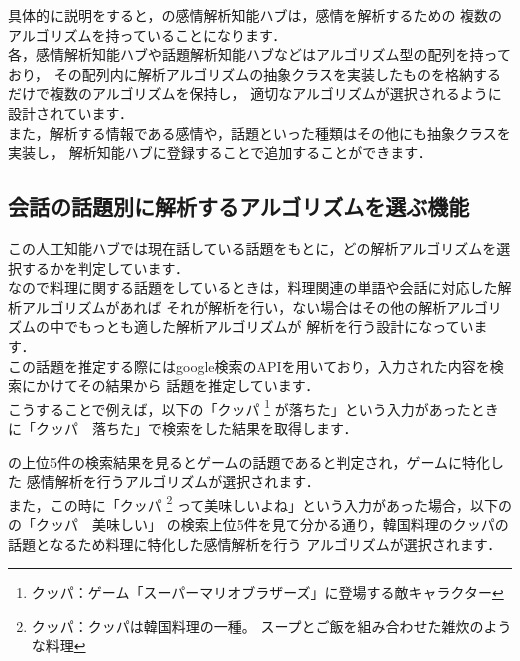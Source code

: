 
具体的に説明をすると，の感情解析知能ハブは，感情を解析するための
複数のアルゴリズムを持っていることになります．\\

各，感情解析知能ハブや話題解析知能ハブなどはアルゴリズム型の配列を持っており，
その配列内に解析アルゴリズムの抽象クラスを実装したものを格納するだけで複数のアルゴリズムを保持し，
適切なアルゴリズムが選択されるように設計されています．\\

また，解析する情報である感情や，話題といった種類はその他にも抽象クラスを実装し，
解析知能ハブに登録することで追加することができます．\\


\subsection{会話の話題別に解析するアルゴリズムを選ぶ機能}
この人工知能ハブでは現在話している話題をもとに，どの解析アルゴリズムを選択するかを判定しています．\\
なので料理に関する話題をしているときは，料理関連の単語や会話に対応した解析アルゴリズムがあれば
それが解析を行い，ない場合はその他の解析アルゴリズムの中でもっとも適した解析アルゴリズムが
解析を行う設計になっています．\\
この話題を推定する際にはgoogle検索のAPIを用いており，入力された内容を検索にかけてその結果から
話題を推定しています．\\
こうすることで例えば，以下の「クッパ
	\footnote{クッパ：ゲーム「スーパーマリオブラザーズ」に登場する敵キャラクター}
が落ちた」という入力があったときに「クッパ　落ちた」で検索をした結果を取得します．


の上位5件の検索結果を見るとゲームの話題であると判定され，ゲームに特化した
感情解析を行うアルゴリズムが選択されます．\\

また，この時に「クッパ
	\footnote{クッパ：クッパは韓国料理の一種。 スープとご飯を組み合わせた雑炊のような料理}
って美味しいよね」という入力があった場合，以下のの「クッパ　美味しい」
の検索上位5件を見て分かる通り，韓国料理のクッパの話題となるため料理に特化した感情解析を行う
アルゴリズムが選択されます．

